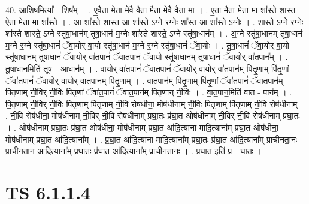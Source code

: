 \documentclass[17pt]{extarticle}
\begin{document}
40. आ॒शिष॒मित्या᳚ - शिष᳚म् । . ए॒वैता मे॒ता मे॒वै वैता मैता मे॒वै वैता मा । . ए॒ता मैता मे॒ता मा शा᳚स्ते शास्त॒ ऐता मे॒ता मा शा᳚स्ते । . आ शा᳚स्ते शास्त॒ आ शा᳚स्ते॒ ऽग्ने र॒ग्नेः शा᳚स्त॒ आ शा᳚स्ते॒ ऽग्नेः । . शा॒स्ते॒ ऽग्ने र॒ग्नेः शा᳚स्ते शास्ते॒ ऽग्ने स्तू॑षा॒धान॑म् तूषा॒धान॑ म॒ग्नेः शा᳚स्ते शास्ते॒ ऽग्ने स्तू॑षा॒धान᳚म् । . अ॒ग्ने स्तू॑षा॒धान॑म् तूषा॒धान॑ म॒ग्ने र॒ग्ने स्तू॑षा॒धानं॑ ॅवा॒योर् वा॒यो स्तू॑षा॒धान॑ म॒ग्ने र॒ग्ने स्तू॑षा॒धानं॑ ॅवा॒योः । . तू॒षा॒धानं॑ ॅवा॒योर् वा॒यो स्तू॑षा॒धान॑म् तूषा॒धानं॑ ॅवा॒योर् वा॑त॒पानं॑ ॅवात॒पानं॑ ॅवा॒यो स्तू॑षा॒धान॑म् तूषा॒धानं॑ ॅवा॒योर् वा॑त॒पान᳚म् । . तू॒षा॒धान॒मिति॑ तूष - आ॒धान᳚म् । . वा॒योर् वा॑त॒पानं॑ ॅवात॒पानं॑ ॅवा॒योर् वा॒योर् वा॑त॒पान॑म् पितृ॒णाम् पि॑तृ॒णां ॅवा॑त॒पानं॑ ॅवा॒योर् वा॒योर् वा॑त॒पान॑म् पितृ॒णाम् । . वा॒त॒पान॑म् पितृ॒णाम् पि॑तृ॒णां ॅवा॑त॒पानं॑ ॅवात॒पान॑म् पितृ॒णाम् नी॒विर् नी॒विः पि॑तृ॒णां ॅवा॑त॒पानं॑ ॅवात॒पान॑म् पितृ॒णान् नी॒विः । . वा॒त॒पान॒मिति॑ वात - पान᳚म् । . पि॒तृ॒णाम् नी॒विर् नी॒विः पि॑तृ॒णाम् पि॑तृ॒णाम् नी॒वि रोष॑धीना॒ मोष॑धीनाम् नी॒विः पि॑तृ॒णाम् पि॑तृ॒णाम् नी॒वि रोष॑धीनाम् । . नी॒वि रोष॑धीना॒ मोष॑धीनाम् नी॒विर् नी॒वि रोष॑धीनाम् प्रघा॒तः प्र॑घा॒त ओष॑धीनाम् नी॒विर् नी॒वि रोष॑धीनाम् प्रघा॒तः । . ओष॑धीनाम् प्रघा॒तः प्र॑घा॒त ओष॑धीना॒ मोष॑धीनाम् प्रघा॒त आ॑दि॒त्याना॑ मादि॒त्याना᳚म् प्रघा॒त ओष॑धीना॒ मोष॑धीनाम् प्रघा॒त आ॑दि॒त्याना᳚म् । . प्र॒घा॒त आ॑दि॒त्याना॑ मादि॒त्याना᳚म् प्रघा॒तः प्र॑घा॒त आ॑दि॒त्याना᳚म् प्राचीनता॒नः प्रा॑चीनता॒न आ॑दि॒त्याना᳚म् प्रघा॒तः प्र॑घा॒त आ॑दि॒त्याना᳚म् प्राचीनता॒नः । . प्र॒घा॒त इति॑ प्र - घा॒तः । \newline
\pagebreak
{}

\section{ TS 6.1.1.4 }
\end{document}

